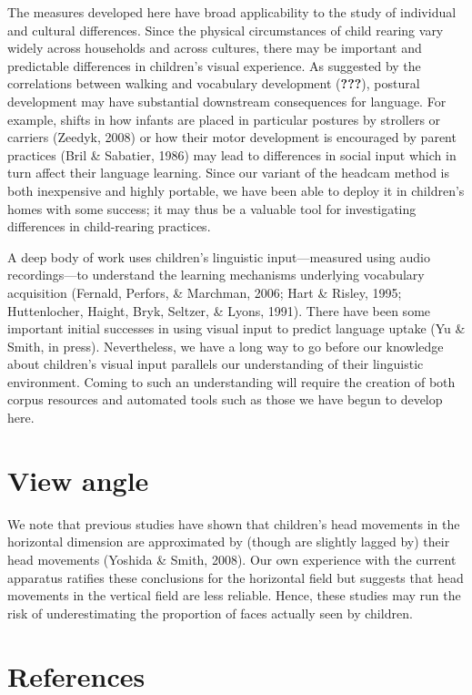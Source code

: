 \documentclass[a4paper,man,apacite,floatsintext,longtable]{apa6}
\begin{document}
The measures developed here have broad applicability to the study of
individual and cultural differences. Since the physical circumstances of
child rearing vary widely across households and across cultures, there
may be important and predictable differences in children's visual
experience. As suggested by the correlations between walking and
vocabulary development ({\textbf{???}}), postural development may have
substantial downstream consequences for language. For example, shifts in
how infants are placed in particular postures by strollers or carriers
(Zeedyk, 2008) or how their motor development is encouraged by parent
practices (Bril \& Sabatier, 1986) may lead to differences in social
input which in turn affect their language learning. Since our variant of
the headcam method is both inexpensive and highly portable, we have been
able to deploy it in children's homes with some success; it may thus be
a valuable tool for investigating differences in child-rearing
practices.

A deep body of work uses children's linguistic input---measured using
audio recordings---to understand the learning mechanisms underlying
vocabulary acquisition (Fernald, Perfors, \& Marchman, 2006; Hart \&
Risley, 1995; Huttenlocher, Haight, Bryk, Seltzer, \& Lyons, 1991).
There have been some important initial successes in using visual input
to predict language uptake (Yu \& Smith, in press). Nevertheless, we
have a long way to go before our knowledge about children's visual input
parallels our understanding of their linguistic environment. Coming to
such an understanding will require the creation of both corpus resources
and automated tools such as those we have begun to develop here.

\section{View angle}\label{view-angle}

We note that previous studies have shown that children's head movements
in the horizontal dimension are approximated by (though are slightly
lagged by) their head movements (Yoshida \& Smith, 2008). Our own
experience with the current apparatus ratifies these conclusions for the
horizontal field but suggests that head movements in the vertical field
are less reliable. Hence, these studies may run the risk of
underestimating the proportion of faces actually seen by children.

\section*{References}\label{references}
\end{document}
